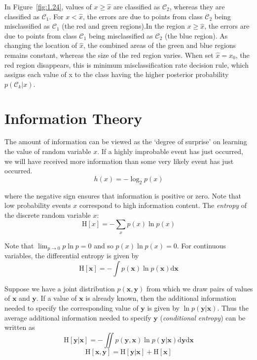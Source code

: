 \documentclass[5p,sort&compress]{elsarticle}
\begin{document}
In Figure~\ref{fig:1.24}, values of $x \geq \hat{x}$ are classified as $\mathcal{C}_2$, whereas they are classified as $\mathcal{C}_1$. For $x < \hat{x}$, the errors are due to points from class $\mathcal{C}_2$ being misclassified as $\mathcal{C}_1$ (the red and green regions).In the region $x \geq \hat{x}$, the errors are due to points from class $\mathcal{C}_1$ being misclassified as $\mathcal{C}_2$ (the blue region). As changing the location of $\hat{x}$, the combined areas of the green and blue regions remains constant, whereas the size of the red region varies. When set $\hat{x}=x_0$, the red region disappears, this is minimum misclassification rate decision rule, which assigns each value of x to the class having the higher posterior probability $p(\mathcal{C}_k|x)$.


\section{Information Theory}
The amount of information can be viewed as the `degree of surprise' on learning the value of random variable $x$. If a highly improbable event has just occurred, we will have received more information than some very likely event has just occurred.
\begin{equation}
h(x)=-\log _{2} p(x)
\end{equation}

where the negative sign ensures that information is positive or zero. Note that low probability events $x$ correspond to high information content. The \textit{entropy} of the discrete random variable $x$:
\begin{equation}
\mathrm{H}[x]=-\sum_{x} p(x) \ln{p(x)}
\end{equation}

Note that $\lim _{p \rightarrow 0} p \ln p=0$ and so $p(x)\ln{p(x)} = 0$. For continuous variables, the differential entropy is given by
\begin{equation}
\mathrm{H}[\mathbf{x}]=-\int p(\mathbf{x}) \ln p(\mathbf{x}) \mathrm{d} \mathbf{x}
\end{equation}

Suppose we have a joint distribution $p(\mathbf{x}, \mathbf{y})$ from which we draw pairs of values of $\mathbf{x}$ and $\mathbf{y}$. If a value of $\mathbf{x}$ is already known, then the additional information needed to specify the corresponding value of $\mathbf{y}$ is given by $\ln{p(\mathbf{y} | \mathbf{x})}$. Thus the average additional information needed to specify $\mathbf{y}$ (\textit{conditional entropy}) can be written as
\begin{equation}
\mathrm{H}[\mathbf{y} | \mathbf{x}]=-\iint p(\mathbf{y}, \mathbf{x}) \ln p(\mathbf{y} | \mathbf{x}) \mathrm{d} \mathbf{y} \mathrm{d} \mathbf{x}
\end{equation}
\begin{equation}
\mathrm{H}[\mathbf{x}, \mathbf{y}]=\mathrm{H}[\mathbf{y} | \mathbf{x}]+\mathrm{H}[\mathbf{x}]
\end{equation}
\end{document}
